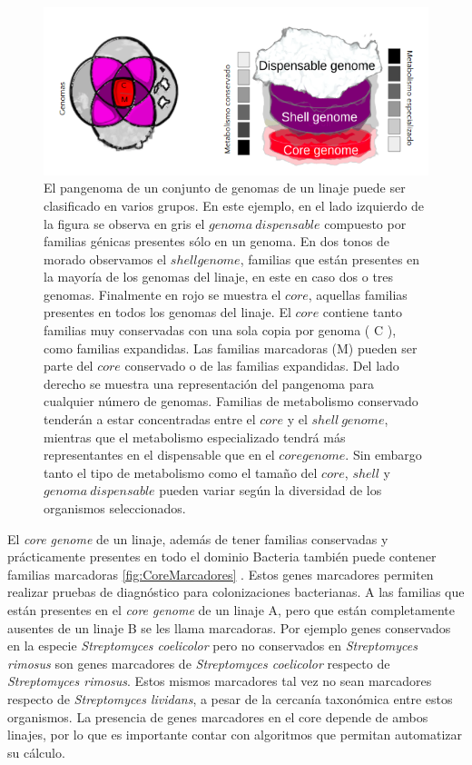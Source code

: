 \documentclass[12pt,twoside]{reedthesis}
\begin{document}
  \begin{figure}[h!tbp]
  \centering
  \includegraphics[angle = 0,scale = .75]{chapter1/Metabolismo-Pangenoma.png}
  \caption[El metabolismo en el Pangenoma]{\footnotesize{El pangenoma de un conjunto de genomas de un linaje puede ser clasificado en varios grupos. En este ejemplo, en el lado izquierdo de la figura se observa en gris el $genoma~dispensable$ compuesto por familias génicas presentes sólo en un genoma. En dos tonos de morado observamos el $shell genome$, familias que están presentes en la mayoría de los genomas del linaje, en este en caso dos o tres genomas. Finalmente en rojo se muestra el $core$, aquellas familias presentes en todos los genomas del linaje. El $core$ contiene tanto familias muy conservadas con una sola copia por genoma ( C ), como familias expandidas. Las familias marcadoras (M) pueden ser parte del $core$ conservado o de las familias expandidas. Del lado derecho se muestra una representación del pangenoma para cualquier número de genomas. Familias de metabolismo conservado tenderán a estar concentradas entre el $core$ y el $shell~genome$, mientras que el metabolismo especializado tendrá más representantes en el dispensable que en el $core genome$. Sin embargo tanto el tipo de metabolismo como el tamaño del $core$, $shell$ y $genoma~dispensable$ pueden variar según la diversidad de los organismos seleccionados. }}
  \label{fig:MetabolismoPangenoma}
  \end{figure}
  
  El \emph{core genome} de un linaje, además de tener familias conservadas
  y prácticamente presentes en todo el dominio Bacteria también puede
  contener familias marcadoras \autoref{fig:CoreMarcadores} . Estos genes
  marcadores permiten realizar pruebas de diagnóstico para colonizaciones
  bacterianas. A las familias que están presentes en el \emph{core genome}
  de un linaje A, pero que están completamente ausentes de un linaje B se
  les llama marcadoras. Por ejemplo genes conservados en la especie
  \emph{Streptomyces coelicolor} pero no conservados en \emph{Streptomyces
  rimosus} son genes marcadores de \emph{Streptomyces coelicolor} respecto
  de \emph{Streptomyces rimosus}. Estos mismos marcadores tal vez no sean
  marcadores respecto de \emph{Streptomyces lividans}, a pesar de la
  cercanía taxonómica entre estos organismos. La presencia de genes
  marcadores en el core depende de ambos linajes, por lo que es importante
  contar con algoritmos que permitan automatizar su cálculo.
  
\end{document}
